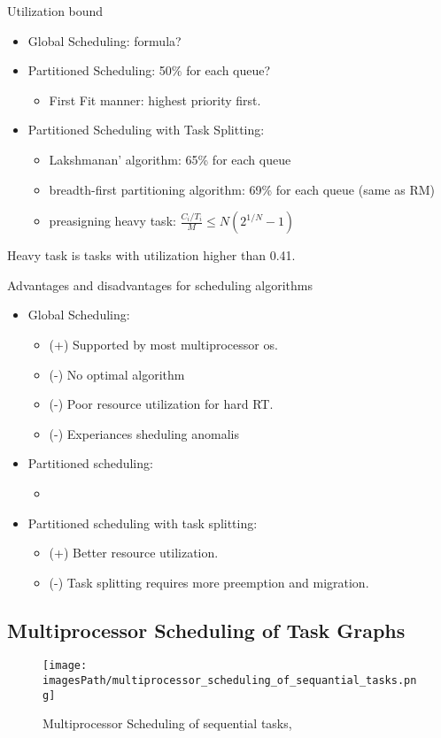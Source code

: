 Utilization bound
\begin{itemize}
  \item Global Scheduling: formula? 
  \item Partitioned Scheduling: 50\% for each queue?
  \begin{itemize}
    \item First Fit manner: highest priority first.
  \end{itemize}
  \item Partitioned Scheduling with Task Splitting: 
  \begin{itemize}
    \item Lakshmanan' algorithm: 65\% for each queue
    \item breadth-first partitioning algorithm: 69\% for each queue (same as RM)
    \item preasigning heavy task: $\frac{C_i/T_i}{M} \leq N(2^{1/N}-1)$
  \end{itemize}
\end{itemize}

Heavy task is tasks with utilization higher than 0.41.

Advantages and disadvantages for scheduling algorithms
\begin{itemize}
  \item Global Scheduling:
  \begin{itemize}
    \item (+) Supported by most multiprocessor os. 
    \item (-) No optimal algorithm  
    \item (-) Poor resource utilization for hard RT.
    \item (-) Experiances sheduling anomalis
  \end{itemize}
  \item Partitioned scheduling:
  \begin{itemize}
    \item 
  \end{itemize}
  \item Partitioned scheduling with task splitting:
  \begin{itemize}
    \item (+) Better resource utilization.
    \item (-) Task splitting requires more preemption and migration.
  \end{itemize}
\end{itemize}


\subsection{Multiprocessor Scheduling of Task Graphs}
\begin{figure}[H]
    \centering
    \texttt{[image: \\imagesPath/multiprocessor\_scheduling\_of\_sequantial\_tasks.png]}
    \caption{Multiprocessor Scheduling of sequential tasks, \cite{11-multiprocessor-2, p.6}}
    \label{multiprocessor_scheduling_of_sequantial_tasks}
\end{figure}

